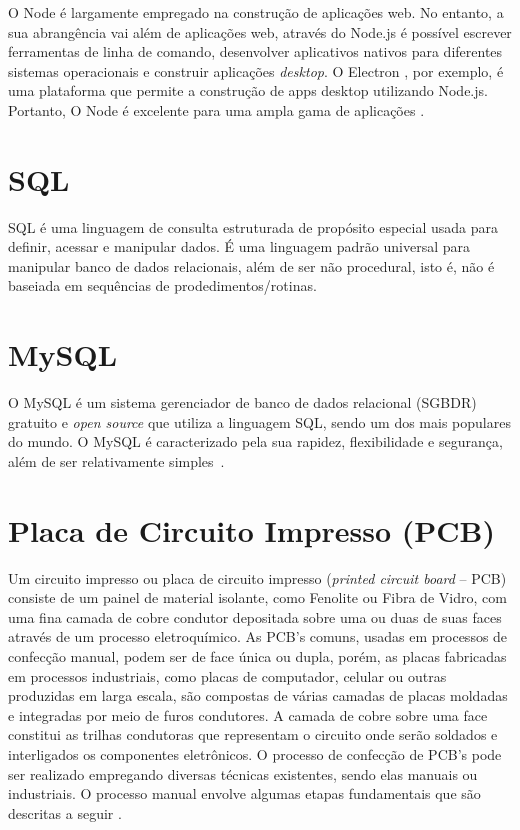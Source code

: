    O Node é largamente empregado na construção de aplicações web. No entanto, a sua abrangência vai além de aplicações web, através do Node.js é possível escrever ferramentas de linha de comando, desenvolver aplicativos nativos para diferentes sistemas operacionais e construir aplicações \textit{desktop}. O Electron \cite{electron.atom}, por exemplo, é uma plataforma que permite a construção de apps desktop utilizando Node.js. Portanto, O Node é excelente para uma ampla gama de aplicações \cite{nodejs2}.

 
\section{SQL}
 
  SQL é uma linguagem de consulta estruturada de propósito especial usada para definir, acessar e manipular dados. É uma linguagem padrão universal para manipular banco de dados relacionais, além de ser não procedural, isto é, não é baseiada em sequências de prodedimentos/rotinas. 
 
 
 \section{MySQL}
 
  O MySQL é um sistema gerenciador de banco de dados relacional (SGBDR) gratuito e \textit{open source} que utiliza a linguagem SQL, sendo um dos mais populares do mundo. O MySQL é caracterizado pela sua rapidez, flexibilidade e segurança, além de ser relativamente simples~\cite{dubois2013}. 


\section{Placa de Circuito Impresso (PCB)}

  Um circuito impresso ou placa de circuito impresso (\textit{printed circuit board} -- PCB) consiste de um painel de material isolante, como Fenolite ou Fibra de Vidro, com uma fina camada de cobre condutor depositada sobre uma ou duas de suas faces através de um processo eletroquímico. As PCB's comuns, usadas em processos de confecção manual, podem ser de face única ou dupla, porém, as placas fabricadas em processos industriais, como placas de computador, celular ou outras produzidas em larga escala, são compostas de várias camadas de placas moldadas e integradas por meio de furos condutores. A camada de cobre sobre uma face constitui as trilhas condutoras que representam o circuito onde serão soldados e interligados os componentes eletrônicos. O processo de confecção de PCB's pode ser realizado empregando diversas técnicas existentes, sendo elas manuais ou industriais. O processo manual envolve algumas etapas fundamentais que são descritas a seguir \cite{pcb, pcb2}.

